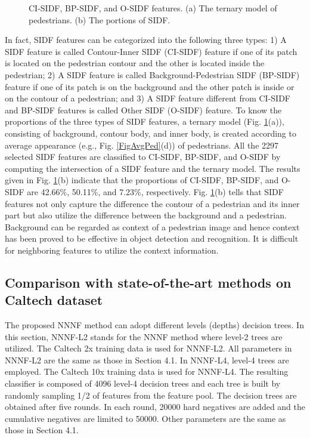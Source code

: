 \documentclass[10pt,twocolumn,letterpaper]{article}
\begin{document}
\begin{figure}[!t]
\centering
{}
\hfil
{}
\caption{CI-SIDF, BP-SIDF, and O-SIDF features. (a) The ternary model of pedestrians. (b) The portions of SIDF.}
\label{FigPerSIDF}
\end{figure}



In fact, SIDF features can be categorized into the following three types: 
1) A SIDF feature is called Contour-Inner SIDF (CI-SIDF) feature if one of 
its patch is located on the pedestrian contour and the other is 
located inside the pedestrian; 2) A SIDF feature is called Background-Pedestrian 
SIDF (BP-SIDF) feature if one of its patch is on the background and the 
other patch is inside or on the contour of a pedestrian; and 3) A SIDF 
feature different from CI-SIDF and BP-SIDF features is called Other SIDF 
(O-SIDF) feature. To know the proportions of the three types of SIDF 
features, a ternary model (Fig. \ref{FigPerSIDF}(a)), consisting of background, contour body, 
and inner body, is created according to average appearance (e.g., Fig. \ref{FigAvgPed}(d)) 
of pedestrians. All the 2297 selected SIDF features are classified to 
CI-SIDF, BP-SIDF, and O-SIDF by computing the intersection of a SIDF feature 
and the ternary model. The results given in Fig. \ref{FigPerSIDF}(b) indicate that the 
proportions of CI-SIDF, BP-SIDF, and O-SIDF are 42.66{\%}, 50.11{\%}, and 
7.23{\%}, respectively. Fig. \ref{FigPerSIDF}(b) tells that SIDF features not only capture 
the difference the contour of a pedestrian and its inner part but also 
utilize the difference between the background and a pedestrian. Background 
can be regarded as context of a pedestrian image and hence context has been 
proved to be effective in object detection and recognition. It is difficult 
for neighboring features to utilize the context information. 

\subsection{Comparison with state-of-the-art methods on Caltech dataset}
The proposed NNNF method can adopt different levels (depths) decision trees. 
In this section, NNNF-L2 stands for the NNNF method where level-2 trees are 
utilized. The Caltech 2x training data is used for NNNF-L2. All parameters 
in NNNF-L2 are the same as those in Section 4.1. In NNNF-L4, level-4 trees 
are employed. The Caltech 10x training data is used for NNNF-L4. The 
resulting classifier is composed of 4096 level-4 decision trees and each 
tree is built by randomly sampling 1/2 of features from the feature pool. 
The decision trees are obtained after five rounds. In each round, 20000 hard 
negatives are added and the cumulative negatives are limited to 50000. Other 
parameters are the same as those in Section 4.1. 
\end{document}
